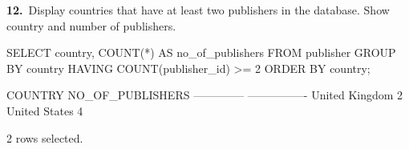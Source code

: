 \noindent\begin{minipage}{\linewidth}
\begingroup{}
{\fontsize{14}{17}\selectfont\textbf{12.}}\ Display countries that have at least two publishers in the database. Show country and number of publishers.\par
\endgroup\vspace{12pt}


\begin{sqlcode}
SELECT country, COUNT(*) AS no_of_publishers
FROM publisher
GROUP BY country
HAVING COUNT(publisher_id) >= 2
ORDER BY country;
\end{sqlcode}

\vspace{18pt}


\begin{sqlout}[fontsize=\small]
COUNTRY         NO_OF_PUBLISHERS
--------------  ----------------
United Kingdom                 2
United States                  4

2 rows selected.
\end{sqlout}
\end{minipage}\par\vspace{24pt}

